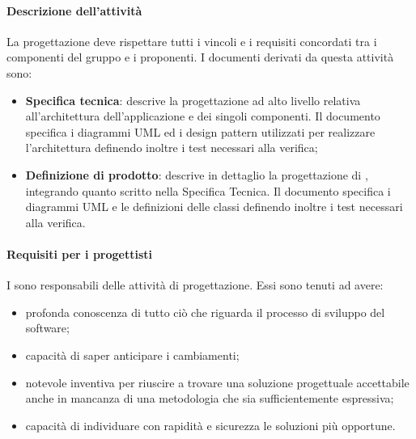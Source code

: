  \paragraph{Descrizione dell'attività}
 La progettazione deve rispettare tutti i vincoli e i requisiti concordati tra i componenti del gruppo
 e i proponenti. I documenti derivati da questa attività sono:
 \begin{itemize}
 	\item \textbf{Specifica tecnica}: descrive la progettazione ad alto livello relativa all'architettura dell'applicazione
 	e dei singoli componenti. Il documento specifica i diagrammi UML ed i design
 	pattern utilizzati per realizzare l'architettura definendo inoltre i test necessari alla verifica;
 	\item \textbf{Definizione di prodotto}: descrive in dettaglio la progettazione di , integrando
 	quanto scritto nella Specifica Tecnica. Il documento specifica i diagrammi UML e le
 	definizioni delle classi definendo inoltre i test necessari alla verifica.
 \end{itemize}
 
 \paragraph{Requisiti per i progettisti}\label{req prog}
 I \PJP{} sono responsabili delle attività di progettazione. Essi sono tenuti ad avere: 
 \begin{itemize}
 	\item profonda conoscenza di tutto ciò che riguarda il processo di sviluppo del software;
 	\item capacità di saper anticipare i cambiamenti;
 	\item notevole inventiva per riuscire a trovare una soluzione progettuale accettabile anche in
mancanza di una metodologia che sia sufficientemente espressiva;
 	\item capacità di individuare con rapidità e sicurezza le soluzioni più opportune.
 \end{itemize}
 
